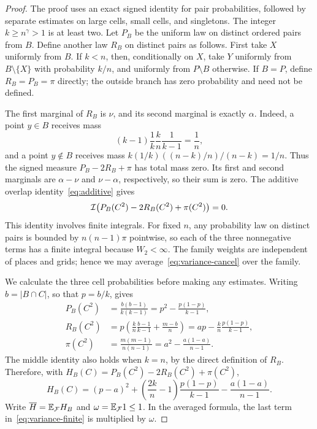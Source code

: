 \begin{proof}
The proof uses an exact signed identity for pair probabilities, followed
by separate estimates on large cells, small cells, and singletons.
The integer $k\ge n^\gamma>1$ is at least two.  Let $P_B$ be the uniform
law on distinct ordered pairs from $B$.  Define another law $R_B$ on
distinct pairs as follows.  First take $X$ uniformly from $B$.  If $k<n$,
then, conditionally on $X$, take $Y$ uniformly from $B\setminus\{X\}$
with probability $k/n$, and uniformly from $P\setminus B$ otherwise.
If $B=P$, define $R_B=P_B=\pi$ directly; the outside branch has zero
probability and need not be defined.

The first marginal of $R_B$ is $\nu$, and its second marginal is exactly
$\alpha$.  Indeed, a point $y\in B$ receives mass
\[
 (k-1)\frac1k\frac{k}{n}\frac1{k-1}=\frac1n,
\]
and a point $y\notin B$ receives mass
$k(1/k)((n-k)/n)/(n-k)=1/n$.  Thus the signed measure
$P_B-2R_B+\pi$ has total mass zero.  Its first and second marginals are
$\alpha-\nu$ and $\nu-\alpha$, respectively, so their sum is zero.
The additive overlap identity~\eqref{eq:additive} gives
\begin{equation}\label{eq:variance-cancel}
 \mathcal I\bigl(P_B(C^2)-2R_B(C^2)+\pi(C^2)\bigr)=0.
\end{equation}
This identity involves finite integrals.  For fixed $n$, any probability
law on distinct pairs is bounded by $n(n-1)\pi$ pointwise, so each of the
three nonnegative terms has a finite integral because $W_2<\infty$.
The family weights are independent of places and grids; hence we may
average~\eqref{eq:variance-cancel} over the family.

We calculate the three cell probabilities before making any estimates.
Writing $b=|B\cap C|$, so that $p=b/k$, gives
\begin{align*}
 P_B(C^2)
 &=\frac{b(b-1)}{k(k-1)}
   =p^2-\frac{p(1-p)}{k-1},\\
 R_B(C^2)
 &=p\left(\frac{k}{n}\frac{b-1}{k-1}+\frac{m-b}{n}\right)
   =ap-\frac{k}{n}\frac{p(1-p)}{k-1},\\
 \pi(C^2)
 &=\frac{m(m-1)}{n(n-1)}
   =a^2-\frac{a(1-a)}{n-1}.
\end{align*}
The middle identity also holds when $k=n$, by the direct definition of
$R_B$.  Therefore, with
$H_B(C)=P_B(C^2)-2R_B(C^2)+\pi(C^2)$,
\begin{equation}\label{eq:variance-finite}
 H_B(C)=(p-a)^2+\left(\frac{2k}{n}-1\right)
                 \frac{p(1-p)}{k-1}
                 -\frac{a(1-a)}{n-1}.
\end{equation}
Write $\overline H=\mathbb E_{\mathcal F}H_B$ and
$\omega=\mathbb E_{\mathcal F}1\le1$.  In the averaged formula, the last term
in~\eqref{eq:variance-finite} is multiplied by $\omega$.


\end{proof}
